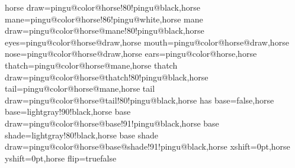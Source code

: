{}{horse \@lr\space draw=\csname pingu@color@horse\@lr\endcsname!80!pingu@black,horse \@lr\space mane=\csname pingu@color@horse\@lr\endcsname!86!pingu@white,horse \@lr\space mane draw=\csname pingu@color@horse\@lr @mane\endcsname!80!pingu@black,horse \@lr\space eyes=\csname pingu@color@horse\@lr @draw\endcsname,horse \@lr\space mouth=\csname pingu@color@horse\@lr @draw\endcsname,horse \@lr\space nose=\csname pingu@color@horse\@lr @draw\endcsname,horse \@lr\space ears=\csname pingu@color@horse\@lr\endcsname,horse \@lr\space thatch=\csname pingu@color@horse\@lr @mane\endcsname,horse \@lr\space thatch draw=\csname pingu@color@horse\@lr @thatch\endcsname!80!pingu@black,horse \@lr\space tail=\csname pingu@color@horse\@lr @mane\endcsname,horse \@lr\space tail draw=\csname pingu@color@horse\@lr @tail\endcsname!80!pingu@black,horse \@lr\space has base=false,horse \@lr\space base=lightgray!90!black,horse \@lr\space base draw=\csname pingu@color@horse\@lr @base\endcsname!91!pingu@black,horse \@lr\space base shade=lightgray!80!black,horse \@lr\space base shade draw=\csname pingu@color@horse\@lr @base@shade\endcsname!91!pingu@black,horse \@lr\space xshift=0pt,horse \@lr\space yshift=0pt,horse \@lr\space flip=\ifx\@lr\pingu@str@wing@left true\else false\fi}

\def\pingu@draw@wi@horse#1{%
    \pingu@setup@wing{horse}{#1}%
\scope[scale=\pingu@@horse@scale,every path/.append style={line cap=round, line join=round},shift=(\pingu@name-wing-#1),rotate around={\@angle-5:(\pingu@name-wing-#1)}]
\csname if@pingu@x@horse@#1@flip@\endcsname
\scope[xshift=-4cm-\csname pingu@x@horse#1@xshift\endcsname,yshift=-42mm+\csname pingu@x@horse#1@yshift\endcsname]
\else
\scope[xshift=4cm+\csname pingu@x@horse#1@xshift\endcsname,yshift=-42mm+\csname pingu@x@horse#1@yshift\endcsname,xscale=-1]
\fi
    \pingu@@drawer@horse{#1}
\endscope\endscope
}


